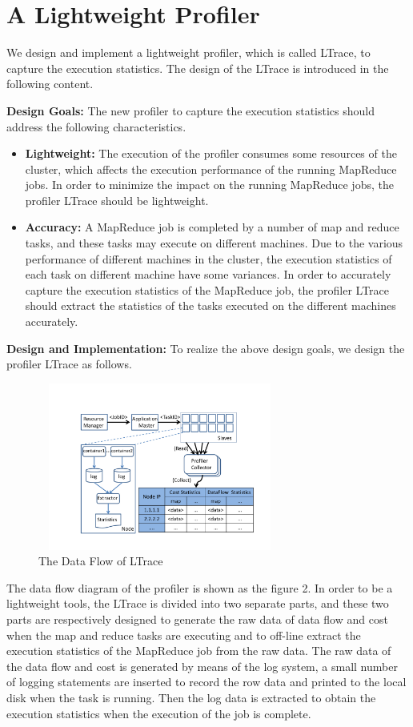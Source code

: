 \section{A Lightweight Profiler}
We design and implement a lightweight profiler, which is called LTrace, to capture the execution statistics. The design of the LTrace is introduced in the following content.

\noindent\textbf{Design Goals: }The new profiler to capture the execution statistics should address the following characteristics.
\begin{itemize}
\item \textbf{Lightweight: }The execution of the profiler consumes some resources of the cluster, which affects the execution performance of the running MapReduce jobs. In order to minimize the impact on the running MapReduce jobs, the profiler LTrace should be lightweight.
\item \textbf{Accuracy: }A MapReduce job is completed by a number of map and reduce tasks, and these tasks may execute on different machines. Due to the various performance of different machines in the cluster, the execution statistics of each task on different machine have some variances. In order to accurately capture the execution statistics of the MapReduce job, the profiler LTrace should extract the statistics of the tasks executed on the different machines accurately.
\end{itemize}

\noindent\textbf{Design and Implementation: }To realize the above design goals, we design the profiler LTrace as follows.

\begin{figure}[htbp]
\begin{center}
\includegraphics[height=5.5cm, width=8cm]{profiler}
\caption{The Data Flow of LTrace}
\end{center}
\end{figure}

The data flow diagram of the profiler is shown as the figure 2. In order to be a lightweight tools, the LTrace is divided into two separate parts, and these two parts are respectively designed to generate the raw data of data flow and cost when the map and reduce tasks are executing and to off-line extract the execution statistics of the MapReduce job from the raw data. The raw data of the data flow and cost is generated by means of the log system, a small number of logging statements are inserted to record the row data and printed to the local disk when the task is running. Then the log data is extracted to obtain the execution statistics when the execution of the job is complete.

